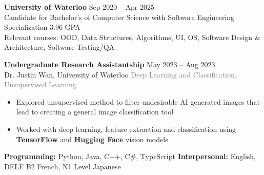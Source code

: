 \documentclass[9pt]{developercv} %
\begin{document}


\begin{minipage}[t]{\textwidth}
	\vspace{-\baselineskip}
	\textbf{University of Waterloo} \hfill Sep 2020 -- Apr 2025 \\
	Candidate for Bachelor's of Computer Science with Software Engineering Specialization \hfill 3.96 GPA \\
	Relevant courses: OOD, Data Structures, Algorithms, UI, OS, Software Design \& Architecture, Software Testing/QA
\end{minipage}


\begin{minipage}[t]{\textwidth}
	\vspace{-\baselineskip}
	\textbf{Undergraduate Research Assistantship} \hfill May 2023 -- Aug 2023\\
	Dr. Justin Wan, \; University of Waterloo \hfill \textcolor{gray}{Deep Learning and Classification, Unsupervised Learning}
	\begin{itemize}[noitemsep,topsep=0pt]
		\item Explored unsupervised method to filter undesirable AI generated images that lead to creating a general image classification tool
		\item Worked with deep learning, feature extraction and classification using \textbf{TensorFlow} and \textbf{Hugging Face} vision models
	\end{itemize}
\end{minipage}


\begin{minipage}[t]{\textwidth}
	\vspace{-\baselineskip}
	\textbf{Programming:} Python, Java, C++, C\#, TypeScript
	\hfill
	\textbf{Interpersonal:} English, DELF B2 French, N1 Level Japanese
\end{minipage}


\end{document}
